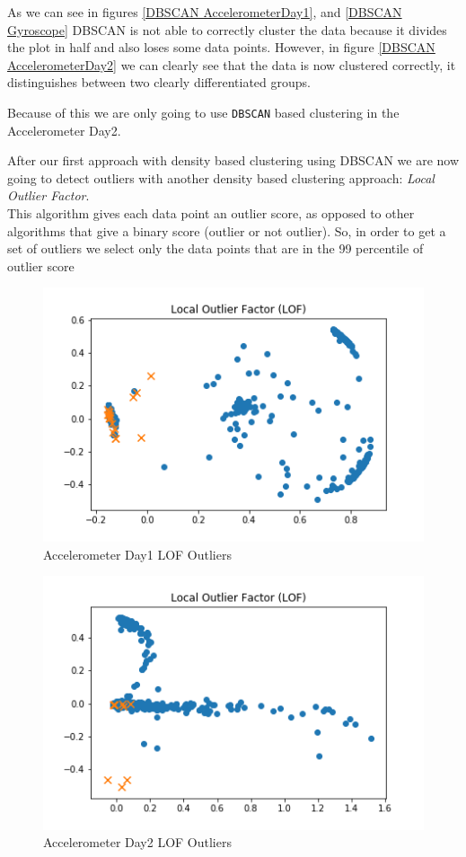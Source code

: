 \documentclass[idxtotoc,hyperref,openany]{labbook} %
\begin{document}
As we can see in figures \ref{DBSCAN AccelerometerDay1}, and \ref{DBSCAN Gyroscope} DBSCAN is not able to correctly cluster the data because it divides the plot in half and also loses some data points. However, in figure \ref{DBSCAN AccelerometerDay2} we can clearly see that the data is now clustered correctly, it distinguishes between two clearly differentiated groups.
 
Because of this we are only going to use \texttt{DBSCAN} based clustering in the Accelerometer Day2.


After our first approach with density based clustering using DBSCAN we are now going to detect outliers with another density based clustering approach: \textit{Local Outlier Factor}.
\\

This algorithm gives each data point an outlier score, as opposed to other algorithms that give a binary score (outlier or not outlier). So, in order to get a set of outliers we select only the data points that are in the 99 percentile of outlier score


\begin{figure}[h]
\includegraphics[width=0.9\linewidth]{LOF_Plot_Accelerometer_Day1.png}
\setlength\belowcaptionskip{-10pt}
\caption{Accelerometer Day1 LOF Outliers}
\label{LOF AccelerometerDay1}
\end{figure}

\begin{figure}[h]
\includegraphics[width=0.9\linewidth]{LOF_Plot_Accelerometer_Day2.png}
\setlength\belowcaptionskip{-10pt}
\caption{Accelerometer Day2 LOF Outliers}
\label{LOF AccelerometerDay2}
\end{figure}
\end{document}
